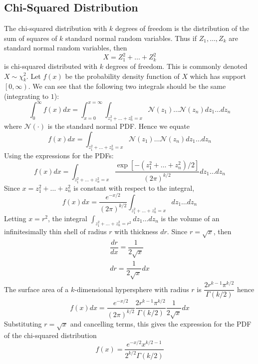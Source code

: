 \documentclass[11pt]{report} %
\begin{document}
\subsection{Chi-Squared Distribution}

The chi-squared distribution with $k$ degrees of freedom is the distribution of the sum of squares of $k$ standard normal random variables. Thus if $Z_{1}, \dots, Z_{k}$ are standard normal random variables, then
\begin{equation}
X = Z_{1}^{2} + \dots + Z_{k}^{2}
\end{equation}
is chi-squared distributed with $k$ degrees of freedom. This is commonly denoted $X \sim \chi_{k}^{2}$. Let $f\left(x\right)$ be the probability density function of $X$ which has support $\left[0, \infty\right)$. We can see that the following two integrals should be the same (integrating to $1$):
\begin{equation}
\int_{0}^{\infty}f\left(x\right)dx = \int_{x = 0}^{x = \infty}\int_{z_{1}^{2} + \dots + z_{n}^{2} = x}\mathcal{N}\left(z_{1}\right)\dots\mathcal{N}\left(z_{n}\right)dz_{1}\dots dz_{n}
\end{equation}
where $\mathcal{N}\left(\cdot\right)$ is the standard normal PDF. Hence we equate
\begin{equation}
f\left(x\right)dx = \int_{z_{1}^{2} + \dots + z_{n}^{2} = x}\mathcal{N}\left(z_{1}\right)\dots\mathcal{N}\left(z_{n}\right)dz_{1}\dots dz_{n}
\end{equation}
Using the expressions for the PDFs:
\begin{equation}
f\left(x\right)dx = \int_{z_{1}^{2} + \dots + z_{n}^{2} = x}\dfrac{\exp\left[-\left(z_{1}^{2} + \dots + z_{n}^{2}\right)/2\right]}{\left(2\pi\right)^{k/2}}dz_{1}\dots dz_{n}
\end{equation}
Since $x = z_{1}^{2} + \dots + z_{n}^{2}$ is constant with respect to the integral,
\begin{equation}
f\left(x\right)dx = \dfrac{e^{-x/2}}{\left(2\pi\right)^{k/2}}\int_{z_{1}^{2} + \dots + z_{n}^{2} = x}dz_{1}\dots dz_{n}
\end{equation}
Letting $x = r^{2}$, the integral $\int_{z_{1}^{2} + \dots + z_{n}^{2} = r^{2}}dz_{1}\dots dz_{n}$ is the volume of an infinitesimally thin shell of radius $r$ with thickness $dr$. Since $r = \sqrt{x}$, then
\begin{gather}
\dfrac{dr}{dx} = \dfrac{1}{2\sqrt{x}} \\
dr = \dfrac{1}{2\sqrt{x}}dx
\end{gather}
The surface area of a $k$-dimensional hypersphere with radius $r$ is $\dfrac{2r^{k-1}\pi^{k/2}}{\Gamma\left(k/2\right)}$ hence
\begin{equation}
f\left(x\right)dx = \dfrac{e^{-x/2}}{\left(2\pi\right)^{k/2}}\dfrac{2r^{k-1}\pi^{k/2}}{\Gamma\left(k/2\right)}\dfrac{1}{2\sqrt{x}}dx
\end{equation}
Substituting $r = \sqrt{x}$ and cancelling terms, this gives the expression for the PDF of the chi-squared distribution
\begin{equation}
f\left(x\right) = \dfrac{e^{-x/2}x^{k/2 - 1}}{2^{k/2}\Gamma\left(k/2\right)}
\end{equation}
\end{document}
